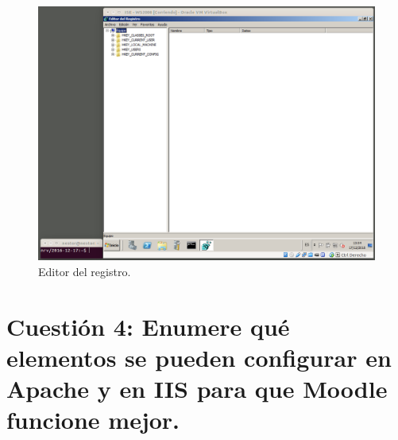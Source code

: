 \documentclass[a4paper,titlepage,12pt]{scrartcl}	%
\numberwithin{figure}{section} %
\numberwithin{table}{section} %
\begin{document}
	\begin{figure}[H]
		\includegraphics[width=\linewidth]{./Imagenes/3b-2.png}
		\vspace{-0.5cm}
		\caption[Editor del registro.]{Editor del registro.}
		\label{3b-2}
	\end{figure}
	
	\section[Cuestión 4: Enumere qué elementos se pueden configurar en Apache y en IIS para que Moodle funcione mejor.]{Cuestión 4: Enumere qué elementos se pueden configurar en Apache y en IIS para que Moodle funcione mejor.}
	
\end{document}
